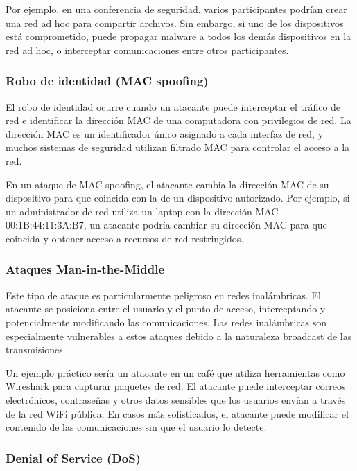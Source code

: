 Por ejemplo, en una conferencia de seguridad, varios participantes podrían crear una red ad hoc para compartir archivos. Sin embargo, si uno de los dispositivos está comprometido, puede propagar malware a todos los demás dispositivos en la red ad hoc, o interceptar comunicaciones entre otros participantes.

\subsubsection{Robo de identidad (MAC spoofing)}

El robo de identidad ocurre cuando un atacante puede interceptar el tráfico de red e identificar la dirección MAC de una computadora con privilegios de red. La dirección MAC es un identificador único asignado a cada interfaz de red, y muchos sistemas de seguridad utilizan filtrado MAC para controlar el acceso a la red.

En un ataque de MAC spoofing, el atacante cambia la dirección MAC de su dispositivo para que coincida con la de un dispositivo autorizado. Por ejemplo, si un administrador de red utiliza un laptop con la dirección MAC 00:1B:44:11:3A:B7, un atacante podría cambiar su dirección MAC para que coincida y obtener acceso a recursos de red restringidos.

\subsubsection{Ataques Man-in-the-Middle}

Este tipo de ataque es particularmente peligroso en redes inalámbricas. El atacante se posiciona entre el usuario y el punto de acceso, interceptando y potencialmente modificando las comunicaciones. Las redes inalámbricas son especialmente vulnerables a estos ataques debido a la naturaleza broadcast de las transmisiones.

Un ejemplo práctico sería un atacante en un café que utiliza herramientas como Wireshark para capturar paquetes de red. El atacante puede interceptar correos electrónicos, contraseñas y otros datos sensibles que los usuarios envían a través de la red WiFi pública. En casos más sofisticados, el atacante puede modificar el contenido de las comunicaciones sin que el usuario lo detecte.

\subsubsection{Denial of Service (DoS)}

